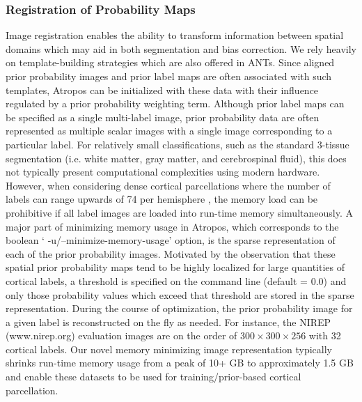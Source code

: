 \documentclass[11pt,english]{article}
\begin{document}
\subsubsection{Registration of Probability Maps} 
Image registration enables the ability to transform information
between spatial domains which may aid in both segmentation and bias
correction.  We rely heavily on template-building strategies
\citep{Avants2010,Avants2010a} which are also offered in ANTs.  Since
aligned prior probability images and prior label maps are often
associated with such templates, Atropos can be initialized with these
data with their influence regulated by a prior probability weighting
term.  Although prior label maps can be specified as a single
multi-label image, prior probability data are often represented as
multiple scalar images with a single image corresponding to a
particular label.  For relatively small classifications, such as the
standard 3-tissue segmentation (i.e. white matter, gray matter, and
cerebrospinal fluid), this does not typically present computational
complexities using modern hardware.  However, when considering dense
cortical parcellations where the number of labels can range upwards of
74 per hemisphere \citep{Destrieux2010}, the memory load can be
prohibitive if all label images are loaded into run-time memory
simultaneously.  A major part of minimizing memory usage in Atropos,
which corresponds to the boolean `{\ttfamily
-u/--minimize-memory-usage}' option, is the sparse representation of
each of the prior probability images.  Motivated by the observation
that these spatial prior probability maps tend to be highly localized
for large quantities of cortical labels, a threshold is specified on
the command line (default = 0.0) and only those probability values
which exceed that threshold are stored in the sparse representation.
During the course of optimization, the prior probability image for a
given label is reconstructed on the fly as needed.  For instance, the
NIREP (www.nirep.org) evaluation images are on the order of $300
\times 300 \times 256$ with 32 cortical labels.  Our novel memory
minimizing image representation typically shrinks run-time memory usage from a
peak of 10+ GB to approximately 1.5 GB and enable these datasets to be
used for training/prior-based cortical parcellation.
 
\end{document}
